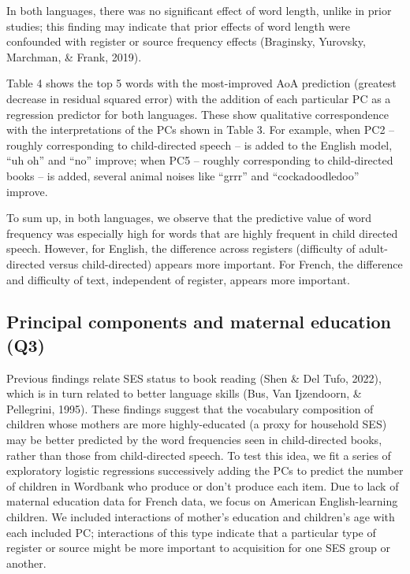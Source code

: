 \documentclass[10pt, letterpaper]{article}
\begin{document}
In both languages, there was no significant effect of word length,
unlike in prior studies; this finding may indicate that prior effects of
word length were confounded with register or source frequency effects
(Braginsky, Yurovsky, Marchman, \& Frank, 2019).

Table 4 shows the top 5 words with the most-improved AoA prediction
(greatest decrease in residual squared error) with the addition of each
particular PC as a regression predictor for both languages. These show
qualitative correspondence with the interpretations of the PCs shown in
Table 3. For example, when PC2 -- roughly corresponding to
child-directed speech -- is added to the English model, ``uh oh'' and
``no'' improve; when PC5 -- roughly corresponding to child-directed
books -- is added, several animal noises like ``grrr'' and
``cockadoodledoo'' improve.

To sum up, in both languages, we observe that the predictive value of
word frequency was especially high for words that are highly frequent in
child directed speech. However, for English, the difference across
registers (difficulty of adult-directed versus child-directed) appears
more important. For French, the difference and difficulty of text,
independent of register, appears more important.

\hypertarget{principal-components-and-maternal-education-q3}{%
\subsection{Principal components and maternal education
(Q3)}\label{principal-components-and-maternal-education-q3}}

Previous findings relate SES status to book reading (Shen \& Del Tufo,
2022), which is in turn related to better language skills (Bus, Van
Ijzendoorn, \& Pellegrini, 1995). These findings suggest that the
vocabulary composition of children whose mothers are more
highly-educated (a proxy for household SES) may be better predicted by
the word frequencies seen in child-directed books, rather than those
from child-directed speech. To test this idea, we fit a series of
exploratory logistic regressions successively adding the PCs to predict
the number of children in Wordbank who produce or don't produce each
item. Due to lack of maternal education data for French data, we focus
on American English-learning children. We included interactions of
mother's education and children's age with each included PC;
interactions of this type indicate that a particular type of register or
source might be more important to acquisition for one SES group or
another.
\end{document}
